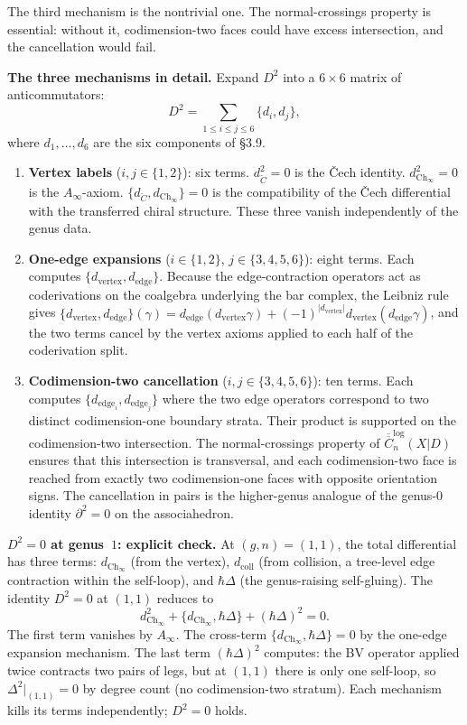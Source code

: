 \documentclass[11pt,reqno]{amsart}
\theoremstyle{definition}
\theoremstyle{remark}
\providecommand{\FM}{\overline{C}}
\numberwithin{equation}{section}
\begin{document}
The third mechanism is the nontrivial one. The normal-crossings
property is essential: without it, codimension-two faces could have
excess intersection, and the cancellation would fail.

\medskip
\noindent\textbf{The three mechanisms in detail.}\enspace
Expand $D^2$ into a $6\times 6$ matrix of anticommutators:
\[
D^2=\sum_{1\le i\le j\le 6}\{d_i,d_j\},
\]
where $d_1,\ldots,d_6$ are the six components of \S3.9.
\begin{enumerate}[label=\textup{Mechanism~\arabic*.},leftmargin=*]
\item \textbf{Vertex labels} ($i,j\in\{1,2\}$): six terms.
$d_{\check C}^2=0$ is the \v Cech identity.
$d_{\mathrm{Ch}_\infty}^2=0$ is the $A_\infty$-axiom.
$\{d_{\check C},d_{\mathrm{Ch}_\infty}\}=0$ is the compatibility
of the \v Cech differential with the transferred chiral structure.
These three vanish independently of the genus data.

\item \textbf{One-edge expansions} ($i\in\{1,2\}$, $j\in\{3,4,5,6\}$):
eight terms. Each computes $\{d_{\mathrm{vertex}},d_{\mathrm{edge}}\}$.
Because the edge-contraction operators act as coderivations on the
coalgebra underlying the bar complex, the Leibniz rule gives
$\{d_{\mathrm{vertex}},d_{\mathrm{edge}}\}(\gamma)=
d_{\mathrm{edge}}(d_{\mathrm{vertex}}\gamma)+
(-1)^{|d_{\mathrm{vertex}}|}d_{\mathrm{vertex}}(d_{\mathrm{edge}}\gamma)$,
and the two terms cancel by the vertex axioms applied to each half
of the coderivation split.

\item \textbf{Codimension-two cancellation} ($i,j\in\{3,4,5,6\}$):
ten terms. Each computes $\{d_{\mathrm{edge}_i},d_{\mathrm{edge}_j}\}$
where the two edge operators correspond to two distinct
codimension-one boundary strata. Their product is supported on the
codimension-two intersection. The normal-crossings property of
$\overline{\FM}_n^{\log}(X|D)$ ensures that this intersection is
transversal, and each codimension-two face is reached from exactly
two codimension-one faces with opposite orientation signs. The
cancellation in pairs is the higher-genus analogue of the genus-$0$
identity $\partial^2=0$ on the associahedron.
\end{enumerate}

\medskip
\noindent\textbf{$D^2=0$ at genus~$1$: explicit check.}\enspace
At $(g,n)=(1,1)$, the total differential has three terms:
$d_{\mathrm{Ch}_\infty}$ (from the vertex),
$d_{\mathrm{coll}}$ (from collision, a tree-level edge contraction
within the self-loop), and $\hbar\Delta$ (the genus-raising self-gluing).
The identity $D^2=0$ at $(1,1)$ reduces to
\[
d_{\mathrm{Ch}_\infty}^2+\{d_{\mathrm{Ch}_\infty},\hbar\Delta\}+(\hbar\Delta)^2=0.
\]
The first term vanishes by $A_\infty$. The cross-term
$\{d_{\mathrm{Ch}_\infty},\hbar\Delta\}=0$ by the one-edge expansion
mechanism. The last term $(\hbar\Delta)^2$ computes: the BV operator
applied twice contracts two pairs of legs, but at $(1,1)$ there is
only one self-loop, so $\Delta^2|_{(1,1)}=0$ by degree count (no
codimension-two stratum). Each mechanism kills its terms
independently; $D^2=0$ holds.
\end{document}
